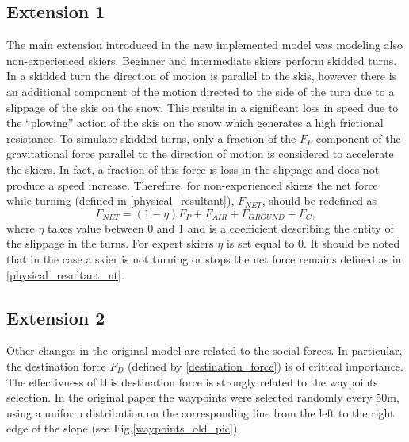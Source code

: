 \documentclass[12pt,a4paper,twoside]{book}
\begin{document}
\subsection{Extension 1}
The main extension introduced in the new implemented model was modeling also non-experienced skiers. Beginner and intermediate skiers perform skidded turns. In a skidded turn the direction of motion is parallel to the skis, however there is an additional component of the motion directed to the side of the turn due to a slippage of the skis on the snow. This results in a significant loss in speed due to the ``plowing'' action of the skis on the snow which generates a high frictional resistance. To simulate skidded turns, only a fraction of the $F_P$ component of the gravitational force parallel to the direction of motion is considered to accelerate the skiers. In fact, a fraction of this force is loss in the slippage and does not produce a speed increase. Therefore, for non-experienced skiers the net force while turning (defined in \ref{physical_resultant}), $F_{NET}$, should be redefined as
\begin{equation}
F_{NET}=(1-\eta) F_P + F_{AIR} + F_{GROUND} + F_C,
\end{equation}
where $\eta$ takes value between 0 and 1 and is a coefficient describing the entity of the slippage in the turns. For expert skiers $\eta$ is set equal to 0. It should be noted that in the case a skier is not turning or stops the net force remains defined as in \ref{physical_resultant_nt}.

\subsection{Extension 2}
Other changes in the original model are related to the social forces. In particular, the destination force $F_D$ (defined by \ref{destination_force}) is of critical importance. The effectivness of this destination force is strongly related to the waypoints selection. In the original paper the waypoints were selected randomly every 50m, using a uniform distribution on the corresponding line from the left to the right edge of the slope (see Fig.\ref{waypoints_old_pic}).
\end{document}
